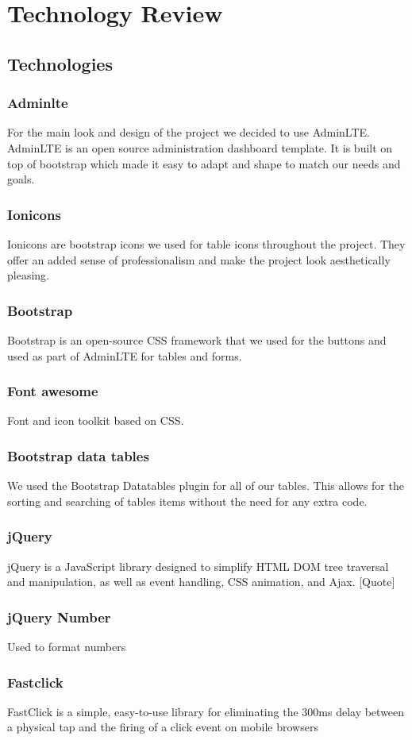 \chapter{Technology Review}
\section{Technologies}
\subsection{Adminlte}
For the main look and design of the project we decided to use AdminLTE. AdminLTE is an open source administration dashboard template. It is built on top of bootstrap which made it easy to adapt and shape to match our needs and goals.
\subsection{Ionicons}
Ionicons are bootstrap icons we used for table icons throughout the project. They offer an added sense of professionalism and make the project look aesthetically pleasing.
\subsection{Bootstrap}
Bootstrap is an open-source CSS framework that we used for the buttons and used as part of AdminLTE for tables and forms.
\subsection{Font awesome} 
Font and icon toolkit based on CSS.
\subsection{Bootstrap data tables}
We used the Bootstrap Datatables plugin for all of our tables. This allows for the sorting and searching of tables items without the need for any extra code. 
\subsection{jQuery}
jQuery is a JavaScript library designed to simplify HTML DOM tree traversal and manipulation, as well as event handling, CSS animation, and Ajax. [Quote]
\subsection{jQuery Number}
Used to format numbers
\subsection{Fastclick}
FastClick is a simple, easy-to-use library for eliminating the 300ms delay between a physical tap and the firing of a click event on mobile browsers
